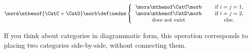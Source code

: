 \begin{ctdefinition}
\begin{enumerate}
              \begin{equation}
                  \mora \mthenof{\CatC+\CatD} \morb \definedas
                  \left\{
                  \begin{tabular}{ccc}
                      $\mora\mthenof\CatC \morb$  &  & if $i=j = 1$, \\
                      $\mora \mthenof\CatD \morb$ &  & if $i = j =2$, \\
                      does not exist              &  & else.
                  \end{tabular}
                  \right.
              \end{equation}
    \end{enumerate}
\end{ctdefinition}

\begin{remark}
    If you think about categories in diagrammatic form, this operation corresponds to placing two categories side-by-side, without connecting them.
\end{remark}

